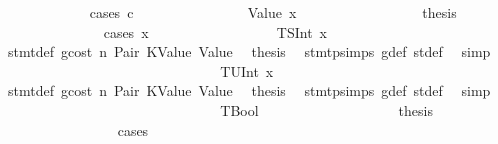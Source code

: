 \begin{isabellebody}
\ \ \ \ \ \ \ \ \ \ \ \ \isamarkupfalse%
\ {\isacharparenleft}{\kern0pt}cases\ c{\isacharparenright}{\kern0pt}\isanewline
\ \ \ \ \ \ \ \ \ \ \ \ \ \ \isamarkupfalse%
\ {\isacharparenleft}{\kern0pt}Value\ x{}{\isacharparenright}{\kern0pt}\isanewline
\ \ \ \ \ \ \ \ \ \ \ \ \ \ \isamarkupfalse%
\ \isamarkupfalse%
\ {\isacharquery}{\kern0pt}thesis\isanewline
\ \ \ \ \ \ \ \ \ \ \ \ \ \ \isamarkupfalse%
\ {\isacharparenleft}{\kern0pt}cases\ x{}{\isacharparenright}{\kern0pt}\isanewline
\ \ \ \ \ \ \ \ \ \ \ \ \ \ \ \ \isamarkupfalse%
\ {\isacharparenleft}{\kern0pt}TSInt\ x{}{\isacharparenright}{\kern0pt}\isanewline
\ \ \ \ \ \ \ \ \ \ \ \ \ \ \ \ \isamarkupfalse%
\ {}{\isacharparenleft}{\kern0pt}{}{\isacharparenright}{\kern0pt}\ stmt{\isacharunderscore}{\kern0pt}def\ gcost\ n\ Pair\ KValue\ Value\ \isamarkupfalse%
\ {\isacharquery}{\kern0pt}thesis\ \isamarkupfalse%
\ stmt{\isachardot}{\kern0pt}psimps{\isacharparenleft}{\kern0pt}{}{\isacharparenright}{\kern0pt}\ g{\isacharunderscore}{\kern0pt}def\ st{\isacharprime}{\kern0pt}{\isacharunderscore}{\kern0pt}def\ \isamarkupfalse%
\ simp\isanewline
\ \ \ \ \ \ \ \ \ \ \ \ \ \ \isamarkupfalse%
\isanewline
\ \ \ \ \ \ \ \ \ \ \ \ \ \ \ \ \isamarkupfalse%
\ {\isacharparenleft}{\kern0pt}TUInt\ x{}{\isacharparenright}{\kern0pt}\isanewline
\ \ \ \ \ \ \ \ \ \ \ \ \ \ \ \ \isamarkupfalse%
\ {}{\isacharparenleft}{\kern0pt}{}{\isacharparenright}{\kern0pt}\ stmt{\isacharunderscore}{\kern0pt}def\ gcost\ n\ Pair\ KValue\ Value\ \isamarkupfalse%
\ {\isacharquery}{\kern0pt}thesis\ \isamarkupfalse%
\ stmt{\isachardot}{\kern0pt}psimps{\isacharparenleft}{\kern0pt}{}{\isacharparenright}{\kern0pt}\ g{\isacharunderscore}{\kern0pt}def\ st{\isacharprime}{\kern0pt}{\isacharunderscore}{\kern0pt}def\ \isamarkupfalse%
\ simp\isanewline
\ \ \ \ \ \ \ \ \ \ \ \ \ \ \isamarkupfalse%
\isanewline
\ \ \ \ \ \ \ \ \ \ \ \ \ \ \ \ \isamarkupfalse%
\ TBool\isanewline
\ \ \ \ \ \ \ \ \ \ \ \ \ \ \ \ \isamarkupfalse%
\ \isamarkupfalse%
\ {\isacharquery}{\kern0pt}thesis\isanewline
\ \ \ \ \ \ \ \ \ \ \ \ \ \ \ \ \isamarkupfalse%
\ cases\isanewline
\ \ \ \ \ \ \ \ \ \ \ \ \ \ \ \ \ \ \isamarkupfalse%

\end{isabellebody}
